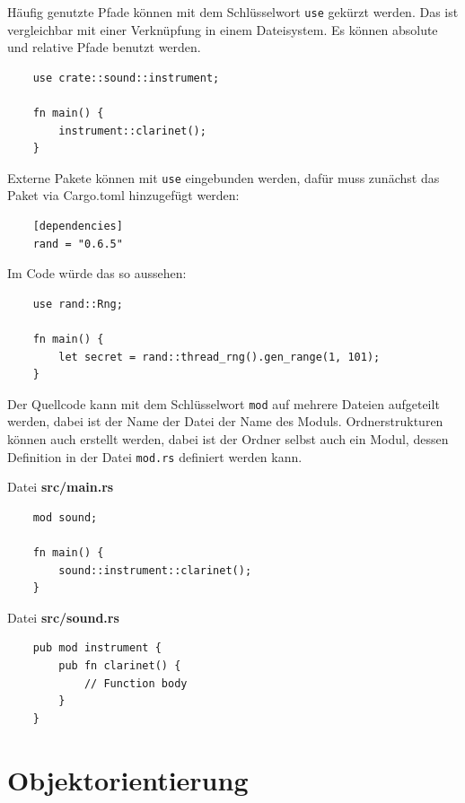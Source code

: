 Häufig genutzte Pfade können mit dem Schlüsselwort \verb"use" gekürzt werden. Das ist vergleichbar mit einer Verknüpfung in einem Dateisystem. Es können absolute und relative Pfade benutzt werden.

\begin{lstlisting}
    use crate::sound::instrument;

    fn main() {
        instrument::clarinet();
    }
\end{lstlisting}

Externe Pakete können mit \verb"use"  eingebunden werden, dafür muss zunächst das Paket via Cargo.toml hinzugefügt werden:

\begin{lstlisting}
    [dependencies]
    rand = "0.6.5"
\end{lstlisting}

\noindent Im Code würde das so aussehen:

\begin{lstlisting}
    use rand::Rng;

    fn main() {
        let secret = rand::thread_rng().gen_range(1, 101);
    }
\end{lstlisting}

Der Quellcode kann mit dem Schlüsselwort \verb"mod" auf mehrere Dateien aufgeteilt werden, dabei ist der Name der Datei der Name des Moduls. Ordnerstrukturen können auch erstellt werden, dabei ist der Ordner selbst auch ein Modul, dessen Definition in der Datei \verb"mod.rs" definiert werden kann.

\vspace{0.5cm}

\noindent Datei \textbf{src/main.rs}

\begin{lstlisting}
    mod sound;

    fn main() {
        sound::instrument::clarinet();
    }
\end{lstlisting}

\vspace{0.5cm}

\noindent Datei \textbf{src/sound.rs}

\begin{lstlisting}
    pub mod instrument {
        pub fn clarinet() {
            // Function body
        }
    }
\end{lstlisting}


\section{Objektorientierung}

